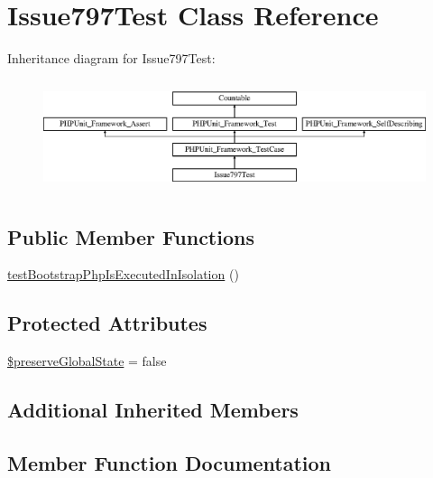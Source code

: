 \hypertarget{class_issue797_test}{}\section{Issue797\+Test Class Reference}
\label{class_issue797_test}
Inheritance diagram for Issue797\+Test\+:\begin{figure}[H]
\begin{center}
\leavevmode
\includegraphics[height=3.303835cm]{class_issue797_test}
\end{center}
\end{figure}
\subsection*{Public Member Functions}
\begin{DoxyCompactItemize}
\item 
\mbox{\hyperlink{class_issue797_test_a8c21e2c041e351f3b9cd9d621c5f15d3}{test\+Bootstrap\+Php\+Is\+Executed\+In\+Isolation}} ()
\end{DoxyCompactItemize}
\subsection*{Protected Attributes}
\begin{DoxyCompactItemize}
\item 
\mbox{\hyperlink{class_issue797_test_a899cb0f144f3e99e6aa5bf17915a7f57}{\$preserve\+Global\+State}} = false
\end{DoxyCompactItemize}
\subsection*{Additional Inherited Members}


\subsection{Member Function Documentation}
\mbox{\label{class_issue797_test_a8c21e2c041e351f3b9cd9d621c5f15d3}} 
